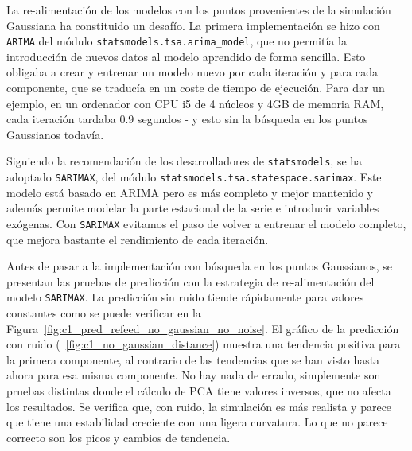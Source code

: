 \documentclass[11pt,spanish,listoffigures,listoftables]{tfgetsinf}
\begin{document}
	La re-alimentación de los modelos con los puntos provenientes de la simulación Gaussiana ha constituido un desafío. La primera implementación se hizo con {\tt ARIMA} del módulo {\tt statsmodels.tsa.arima\_model}, que no permitía la introducción de nuevos datos al modelo aprendido de forma sencilla. Esto obligaba a crear y entrenar un modelo nuevo por cada iteración y para cada componente, que se traducía en un coste de tiempo de ejecución. Para dar un ejemplo, en un ordenador con CPU i5 de 4 núcleos y 4GB de memoria RAM, cada iteración tardaba \(0.9\) segundos - y esto sin la búsqueda en los puntos Gaussianos todavía.
	
	Siguiendo la recomendación de los desarrolladores de {\tt statsmodels}, se ha adoptado {\tt SARIMAX}, del módulo {\tt statsmodels.tsa.statespace.sarimax}. Este modelo está basado en ARIMA pero es más completo y mejor mantenido y además permite modelar la parte estacional de la serie e introducir variables exógenas. Con {\tt SARIMAX} evitamos el paso de volver a entrenar el modelo completo, que mejora bastante el rendimiento de cada iteración.
	
	Antes de pasar a la implementación con búsqueda en los puntos Gaussianos, se presentan las pruebas de predicción con la estrategia de re-alimentación del modelo {\tt SARIMAX}. La predicción sin ruido tiende rápidamente para valores constantes como se puede verificar en la Figura~\ref{fig:c1_pred_refeed_no_gaussian_no_noise}. El gráfico de la predicción con ruido (~\ref{fig:c1_no_gaussian_distance}) muestra una tendencia positiva para la primera componente, al contrario de las tendencias que se han visto hasta ahora para esa misma componente. No hay nada de errado, simplemente son pruebas distintas donde el cálculo de PCA tiene valores inversos, que no afecta los resultados. Se verifica que, con ruido, la simulación es más realista y parece que tiene una estabilidad creciente con una ligera curvatura. Lo que no parece correcto son los picos y cambios de tendencia.
	
\end{document}
